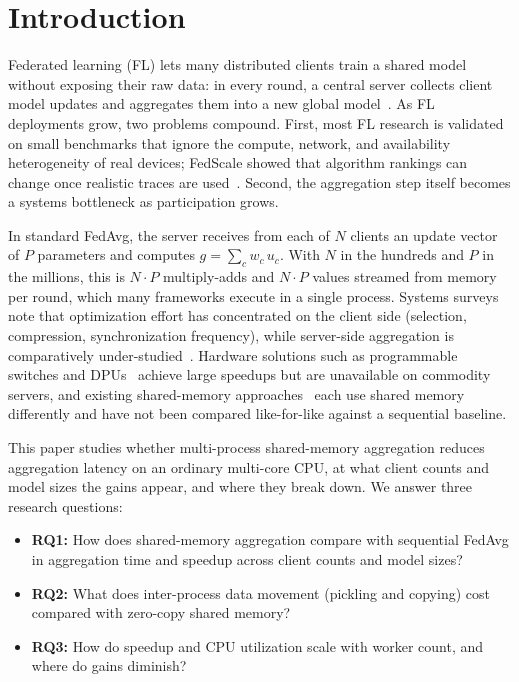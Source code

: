 \documentclass[conference]{IEEEtran}
\begin{document}
\section{Introduction}
Federated learning (FL) lets many distributed clients train a shared model without exposing their raw data: in every round, a central server collects client model updates and aggregates them into a new global model~\cite{mcmahan2017}. As FL deployments grow, two problems compound. First, most FL research is validated on small benchmarks that ignore the compute, network, and availability heterogeneity of real devices; FedScale showed that algorithm rankings can change once realistic traces are used~\cite{fedscale}. Second, the aggregation step itself becomes a systems bottleneck as participation grows.

In standard FedAvg, the server receives from each of $N$ clients an update vector of $P$ parameters and computes $g=\sum_{c} w_c\,u_c$. With $N$ in the hundreds and $P$ in the millions, this is $N\!\cdot\!P$ multiply-adds and $N\!\cdot\!P$ values streamed from memory per round, which many frameworks execute in a single process. Systems surveys note that optimization effort has concentrated on the client side (selection, compression, synchronization frequency), while server-side aggregation is comparatively under-studied~\cite{jiang2022}. Hardware solutions such as programmable switches and DPUs~\cite{gain,flagger} achieve large speedups but are unavailable on commodity servers, and existing shared-memory approaches~\cite{khan2023,lifl,falkor} each use shared memory differently and have not been compared like-for-like against a sequential baseline.

This paper studies whether multi-process shared-memory aggregation reduces aggregation latency on an ordinary multi-core CPU, at what client counts and model sizes the gains appear, and where they break down. We answer three research questions:
\begin{itemize}
\item \textbf{RQ1:} How does shared-memory aggregation compare with sequential FedAvg in aggregation time and speedup across client counts and model sizes?
\item \textbf{RQ2:} What does inter-process data movement (pickling and copying) cost compared with zero-copy shared memory?
\item \textbf{RQ3:} How do speedup and CPU utilization scale with worker count, and where do gains diminish?
\end{itemize}
\end{document}
